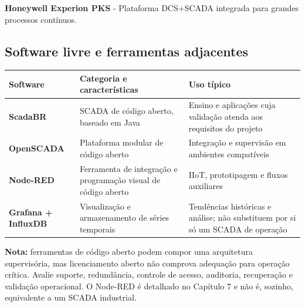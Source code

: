 \textbf{Honeywell Experion PKS}
- Plataforma DCS+SCADA integrada para grandes processos contínuos.

\subsection{Software livre e ferramentas adjacentes}\label{software-livre-e-ferramentas-adjacentes}

\begin{longtable}[]{@{}
  >{\raggedright\arraybackslash}p{}
  >{\raggedright\arraybackslash}p{}
  >{\raggedright\arraybackslash}p{}@{}}
\toprule\noalign{}
\begin{minipage}[b]{\linewidth}\raggedright
Software
\end{minipage} & \begin{minipage}[b]{\linewidth}\raggedright
Categoria e características
\end{minipage} & \begin{minipage}[b]{\linewidth}\raggedright
Uso típico
\end{minipage} \\
\midrule\noalign{}
\endhead
\bottomrule\noalign{}
\endlastfoot
\textbf{ScadaBR} & SCADA de código aberto, baseado em Java & Ensino e aplicações cuja validação atenda aos requisitos do projeto \\
\textbf{OpenSCADA} & Plataforma modular de código aberto & Integração e supervisão em ambientes compatíveis \\
\textbf{Node-RED} & Ferramenta de integração e programação visual de código aberto & IIoT, prototipagem e fluxos auxiliares \\
\textbf{Grafana + InfluxDB} & Visualização e armazenamento de séries temporais & Tendências históricas e análise; não substituem por si só um SCADA de operação \\
\end{longtable}

\begin{caixanota}

\textbf{Nota:} ferramentas de código aberto podem compor uma arquitetura supervisória, mas licenciamento aberto não comprova adequação para operação crítica. Avalie suporte, redundância, controle de acesso, auditoria, recuperação e validação operacional. O Node-RED é detalhado no Capítulo 7 e não é, sozinho, equivalente a um SCADA industrial.

\end{caixanota}

